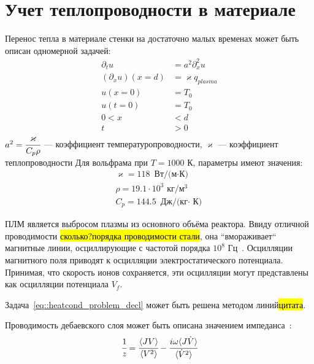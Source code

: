 \section{Учет теплопроводности в материале}

Перенос тепла в материале стенки на достаточно малых временах может быть описан одномерной задачей:
\begin{subequations}
    \begin{align}
        \partial_t u &= a^2 \partial^2_x u\\
        \left(\partial_x u\right)(x = d) &= \varkappa q_{plasma}\\
        u(x = 0) &= T_0 \\
        u(t = 0) &= T_0 \\
        0 < x &< d \\
        t &> 0
    \end{align}
    \label{eq::heatcond_problem_decl}
\end{subequations}
$a^2 = \cfrac{\varkappa}{C_p\rho}$ --- коэффициент температуропроводности, $\varkappa$ --- коэффициент теплопроводности
Для вольфрама при $T = 1000$ К, параметры имеют значения:
\begin{subequations}
    \begin{align*}
        \varkappa = 118\text{ Вт/(м$\cdot$К)}\\
        \rho = 19.1\cdot 10^3\text{ кг/м$^3$}\\
        C_p = 144.5\text{ Дж/(кг$\cdot$ К)}
    \end{align*}
\end{subequations}

ПЛМ является выбросом плазмы из основного объёма реактора. Ввиду отличной проводимости \hl{сколько?порядка проводимости стали}, 
она ``вмораживает`` магнитные линии, осциллирующие с частотой порядка $10^8$ Гц~\cite{kirk2006evolution}. Осцилляции 
магнитного поля приводят к осцилляции электростатического потенциала. Принимая, что скорость ионов сохраняется, 
эти осцилляции могут представлены как осцилляции потенциала $V_f$.

Задача~\eqref{eq::heatcond_problem_decl} может быть решена методом линий\hl{цитата}.

Проводимость дебаевского слоя может быть описана значением импеданса~\cite{myra2015radio}:
\begin{equation}
    \cfrac{1}{z} = \cfrac{\langle JV\rangle}{\langle V^2\rangle} - \cfrac{i\omega\langle J\dot{V}\rangle}{\langle \dot{V}^2\rangle}
\end{equation}

